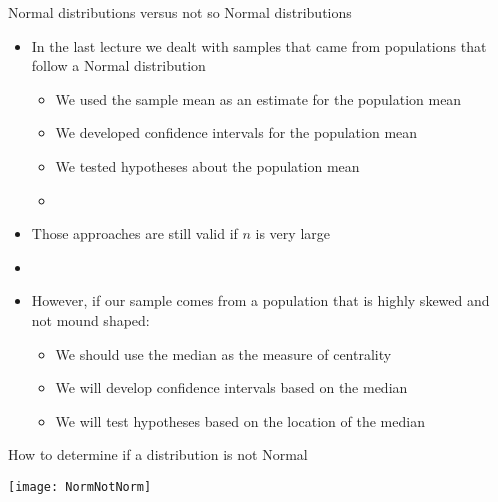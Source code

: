 \documentclass[xcolor=dvipsnames]{beamer}
\begin{document}
\begin{frame}{Normal distributions versus not so Normal distributions}
	\begin{itemize}
		\item In the last lecture we dealt with samples that came from populations that follow a Normal distribution \pause
		\begin{itemize}
			\item We used the sample mean as an estimate for the population mean \pause
			\item We developed confidence intervals for the population mean \pause
			\item We tested hypotheses about the population mean \pause
			\item[]
		\end{itemize}
		\item Those approaches are still valid if $n$ is very large \pause
		\item[]
		\item However, if our sample comes from a population that is highly skewed and not mound shaped:  \pause
		\begin{itemize}
			\item We should use the median as the measure of centrality \pause
			\item We will develop confidence intervals based on the median \pause
			\item We will test hypotheses based on the location of the median
		\end{itemize}
	\end{itemize}
\end{frame}

\begin{frame}{How to determine if a distribution is not Normal}
\begin{center}
	\texttt{[image: NormNotNorm]}
\end{center}
\end{frame}
\end{document}
